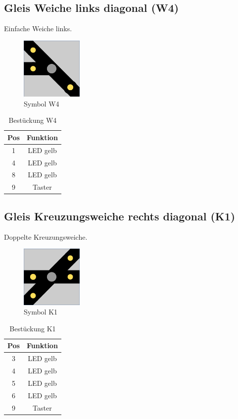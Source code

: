 \documentclass[10pt,a4paper]{article}
\begin{document}
\subsection{Gleis Weiche links diagonal (W4)}
Einfache Weiche links.
\begin{figure}[hbtp]
\centering
\includegraphics[width=3cm]{../folien/w4.png}
\caption{Symbol W4}
\end{figure}
\begin{table}[h!]
\centering
\begin{tabular}{c|c}
\textbf{Pos} & \textbf{Funktion} \\ \hline
1 & LED gelb \\
4 & LED gelb \\
8 & LED gelb \\
9 & Taster
\end{tabular}
\caption{Bestückung W4}
\end{table}

\newpage
\subsection{Gleis Kreuzungsweiche rechts diagonal (K1)}
Doppelte Kreuzungsweiche.
\begin{figure}[hbtp]
\centering
\includegraphics[width=3cm]{../folien/k1.png}
\caption{Symbol K1}
\end{figure}
\begin{table}[h!]
\centering
\begin{tabular}{c|c}
\textbf{Pos} & \textbf{Funktion} \\ \hline
3 & LED gelb \\
4 & LED gelb \\
5 & LED gelb \\
6 & LED gelb \\
9 & Taster
\end{tabular}
\caption{Bestückung K1}
\end{table}
\end{document}

